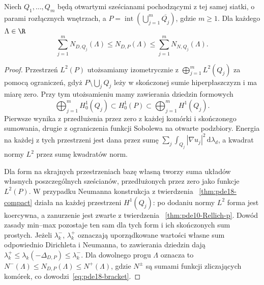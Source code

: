 \begin{lemat}
\label{lem:pde18-bracket}
Niech $Q_1,\ldots,Q_m$ będą otwartymi sześcianami
pochodzącymi z tej samej siatki, o parami rozłącznych
wnętrzach, a $P=\operatorname{int}(\bigcup_{j=1}^m
\overline{Q_j})$, gdzie $m\ge1$. Dla każdego $\Lambda\in\R$
\begin{equation}\label{eq:pde18-bracket}
 \sum_{j=1}^m N_{D,Q_j}(\Lambda)
 \le N_{D,P}(\Lambda)
 \le\sum_{j=1}^m N_{N,Q_j}(\Lambda).
\end{equation}
\end{lemat}
\begin{proof}
Przestrzeń $L^2(P)$ utożsamiamy izometrycznie z
$\bigoplus_{j=1}^m L^2(Q_j)$ za pomocą ograniczeń,
gdyż $P\setminus\bigcup_j Q_j$ leży w skończonej sumie
hiperpłaszczyzn i ma miarę zero. Przy tym utożsamieniu
mamy zawierania dziedzin formowych
\[
 \bigoplus_{j=1}^m H_0^1(Q_j)
 \subset H_0^1(P)\subset
 \bigoplus_{j=1}^m H^1(Q_j).
\]
Pierwsze wynika z przedłużenia przez zero z każdej
komórki i skończonego sumowania, drugie z ograniczenia
funkcji Sobolewa na otwarte podzbiory. Energia na każdej
z tych przestrzeni jest dana przez sumę
$\sum_j\int_{Q_j}|\nabla u_j|^2\,\mathrm d\lambda_d$,
a kwadrat normy $L^2$ przez sumę kwadratów norm.

Dla form na skrajnych przestrzeniach bazę własną tworzy
suma układów własnych poszczególnych sześcianów,
przedłużonych przez zero jako funkcje $L^2(P)$.
W przypadku Neumanna konstrukcja z twierdzenia
~\ref{thm:pde18-compact} działa na każdej przestrzeni
$H^1(Q_j)$: po dodaniu normy $L^2$ forma jest
koercywna, a zanurzenie jest zwarte z twierdzenia
~\ref{thm:pde10-Rellich-p}. Dowód zasady min--max
pozostaje ten sam dla tych form i ich skończonych sum prostych.
Jeżeli $\lambda_k^-$, $\lambda_k^+$ oznaczają uporządkowane
wartości własne sum odpowiednio Dirichleta i Neumanna,
to zawierania dziedzin dają
$\lambda_k^+\le\lambda_k(-\Delta_{D,P})\le\lambda_k^-$.
Dla dowolnego progu $\Lambda$ oznacza to
$N^-(\Lambda)\le N_{D,P}(\Lambda)\le N^+(\Lambda)$,
gdzie $N^\pm$ są sumami funkcji zliczających komórek,
co dowodzi~\eqref{eq:pde18-bracket}.
\end{proof}

